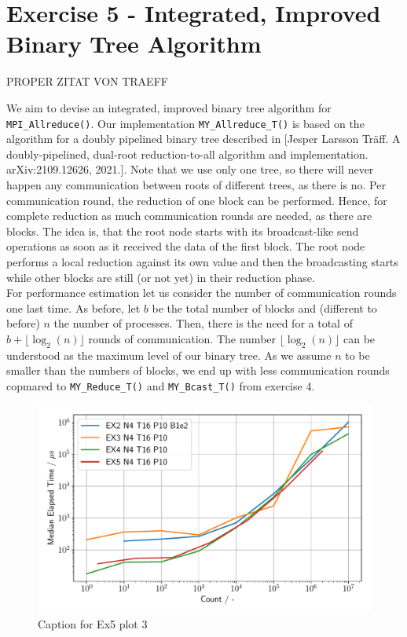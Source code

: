 \section{Exercise 5 - Integrated, Improved Binary Tree Algorithm}

PROPER ZITAT VON TRAEFF 

We aim to devise an integrated, improved binary tree algorithm for \texttt{MPI\_Allreduce()}. Our 
implementation \texttt{MY\_Allreduce\_T()} is based on the algorithm for a doubly pipelined binary 
tree described in [Jesper Larsson Träff. A doubly-pipelined, dual-root reduction-to-all algorithm and 
implementation. arXiv:2109.12626, 2021.]. Note that we use only one tree, so there will never happen any 
communication between roots of different trees, as there is no. Per communication round, the reduction of 
one block can be performed. Hence, for complete reduction as much communication rounds are needed, 
as there are blocks. The idea is, that the root node starts with its broadcast-like send operations 
as soon as it received the data of the first block. The root node performs a local reduction against 
its own value and then the broadcasting starts while other blocks are still (or not yet) 
in their reduction phase. \\

For performance estimation let us consider the number of communication rounds one last time. As before, let 
$b$ be the total number of blocks and (different to before) $n$ the number of processes. Then, there is 
the need for a total of $b+\lfloor \log_2(n)\rfloor$ rounds of communication. The number $\lfloor \log_2(n)\rfloor$
can be understood as the maximum level of our binary tree. As we assume $n$ to be smaller than the numbers
of blocks, we end up with less communication rounds copmared to \texttt{MY\_Reduce\_T()} and \texttt{MY\_Bcast\_T()}
 from exercise 4.\\

\begin{figure}[h]
    \begin{center}
        \includegraphics[width=1.0\linewidth]{figures/Ex5_3.pdf}
        \caption{Caption for Ex5 plot 3}
        \label{Ex5_3_p}
    \end{center}
\end{figure}

